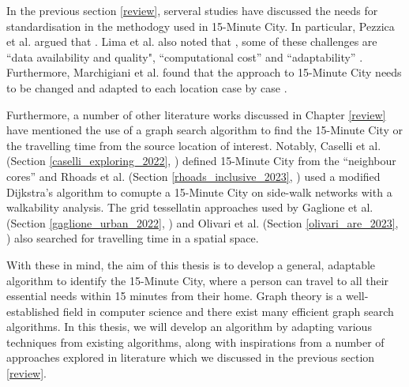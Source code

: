 In the previous section \ref{review}, serveral studies have discussed the needs for standardisation in the methodogy used in 15-Minute City. In particular, Pezzica et al. argued that  \cite{Pezzica_Altafini_Mara_Chioni_2024}. Lima et al. also noted that , some of these challenges are ``data availability and quality", ``computational cost'' and ``adaptability'' \cite{lima_quest_2023}. Furthermore, Marchigiani et al. found that the approach to 15-Minute City needs to be changed and adapted to each location case by case \cite{marchigiani_urban_2022}.

Furthermore, a number of other literature works discussed in Chapter \ref{review} have mentioned the use of a graph search algorithm to find the 15-Minute City or the travelling time from the source location of interest. Notably, Caselli et al. (Section \ref{caselli_exploring_2022}, \cite{caselli_exploring_2022}) defined 15-Minute City from the ``neighbour cores'' and Rhoads et al. (Section \ref{rhoads_inclusive_2023}, \cite{rhoads_inclusive_2023}) used a modified Dijkstra's algorithm to comupte a 15-Minute City on side-walk networks with a walkability analysis. The grid tessellatin approaches used by Gaglione et al. (Section \ref{gaglione_urban_2022}, \cite{gaglione_urban_2022}) and Olivari et al. (Section \ref{olivari_are_2023}, \cite{olivari_are_2023}) also searched for travelling time in a spatial space.

With these in mind, the aim of this thesis is to develop a general, adaptable algorithm to identify the 15-Minute City, where a person can travel to all their essential needs within 15 minutes from their home. Graph theory is a well-established field in computer science and there exist many efficient graph search algorithms. In this thesis, we will develop an algorithm by adapting various techniques from existing algorithms, along with inspirations from a number of approaches explored in literature which we discussed in the previous section \ref{review}.

